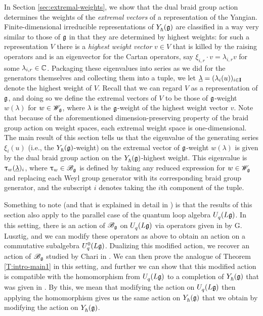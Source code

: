 In Section \ref{sec:extremal-weights}, we show that the dual braid group action determines the weights of the \emph{extremal vectors} of a representation of the Yangian.
Finite-dimensional irreducible representations of $\Yhg$ are classified in a way very similar to those of $\g$ in that they are determined by highest weights: for such a representation $V$ there is a \emph{highest weight vector} $v\in V$ that is killed by the raising operators and is an eigenvector for the Cartan operators, say $\xi_{i,r}\cdot v = \lambda_{i,r}v$ for some $\lambda_{i,r}\in\C$.
Packaging these eigenvalues into series as we did for the generators themselves and collecting them into a tuple, we let $\ul = (\lambda_i(u))_{i\in\I}$ denote the highest weight of $V$.
Recall that we can regard $V$ as a representation of $\g$, and doing so we define the extremal vectors of $V$ to be those of $\g$-weight $w(\lambda)$ for $w\in\Wg$, where $\lambda$ is the $\g$-weight of the highest weight vector $v$.
Note that because of the aforementioned dimension-preserving property of the braid group action on weight spaces, each extremal weight space is one-dimensional.
The main result of this section tells us that the eigenvalue of the generating series $\xi_i(u)$ (i.e., the $\Yhg$-weight) on the extremal vector of $\g$-weight $w(\lambda)$ is given by the dual braid group action on the $\Yhg$-highest weight.
This eigenvalue is $\braid_w(\ul)_i$, where $\braid_w\in\Bg$ is defined by taking any reduced expression for $w\in\Wg$ and replacing each Weyl group generator with its corresponding braid group generator, and the subscript $i$ denotes taking the $i$th component of the tuple.

Something to note (and that is explained in detail in \cite[\S 6]{friesen_braid_2024}) is that the results of this section also apply to the parallel case of the quantum loop algebra $\UqLg$.
In this setting, there is an action of $\Bg$ on $\UqLg$ via operators given in \cite{lusztig_introduction_2010} by G. Lusztig, and we can modify these operators as above to obtain an action on a commutative subalgebra $\UqLg[0]$.
Dualizing this modified action, we recover an action of $\Bg$ studied by Chari in \cite{chari_braid_2002}.
We can then prove the analogue of Theorem \ref{T:intro-main1} in this setting, and further we can show that this modified action is compatible with the homomorphism from $\UqLg$ to a completion of $\Yhg$ that was given in \cite{gautam_yangians_2013}.
By this, we mean that modifying the action on $\UqLg$ then applying the homomorphism gives us the same action on $\Yhg$ that we obtain by modifying the action on $\Yhg$.


